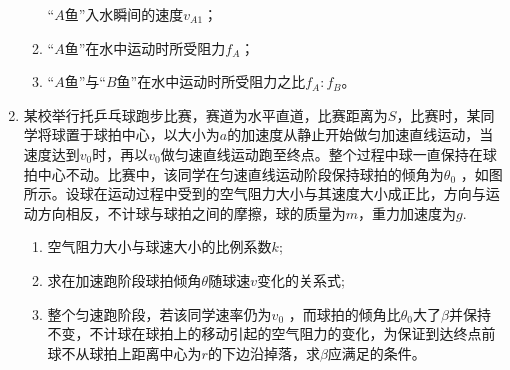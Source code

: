 \begin{enumerate}[leftmargin=0em]
\begin{enumerate}
“$ A $鱼”入水瞬间的速度$ v_{A1} $；


\item 
“$ A $鱼”在水中运动时所受阻力$ f_A $；


\item 
“$ A $鱼”与“$ B $鱼”在水中运动时所受阻力之比$ f_A : f_B $。

\end{enumerate}
\begin{figure}[h!]
\flushright

\end{figure}



\newpage	
\item 
{}
某校举行托乒乓球跑步比赛，赛道为水平直道，比赛距离为$ S $，比赛时，某同学将球置于球拍中心，以大小为$ a $的加速度从静止开始做匀加速直线运动，当速度达到$ v_{0} $时，再以$ v_0 $做匀速直线运动跑至终点。整个过程中球一直保持在球拍中心不动。比赛中，该同学在匀速直线运动阶段保持球拍的倾角为$ \theta _0 $ ，如图所示。设球在运动过程中受到的空气阻力大小与其速度大小成正比，方向与运动方向相反，不计球与球拍之间的摩擦，球的质量为$ m $，重力加速度为$ g $.
\begin{enumerate}
\renewcommand{\labelenumi}{\arabic{enumi}.}
\item
空气阻力大小与球速大小的比例系数$ k $;
\item 
求在加速跑阶段球拍倾角$ \theta $随球速$ v $变化的关系式;
\item 
整个匀速跑阶段，若该同学速率仍为$ v_{0} $ ，而球拍的倾角比$ \theta _0 $大了$ \beta $并保持不变，不计球在球拍上的移动引起的空气阻力的变化，为保证到达终点前球不从球拍上距离中心为$ r $的下边沿掉落，求$ \beta $应满足的条件。


\end{enumerate}
\end{enumerate}
